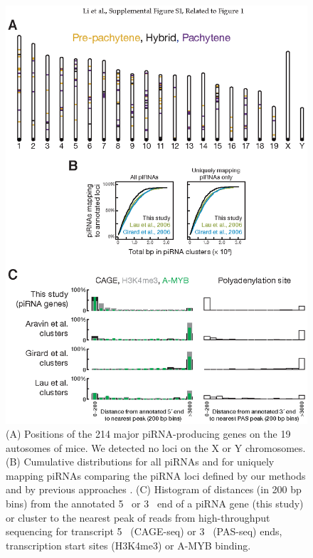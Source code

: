     \begin{figure}[htbp] %
      \centering 
      \includegraphics{Figures/MolCel/MolCel2013_FigS1.eps}
      \caption[The Major piRNA-Producing Genes of the Post-Partum Mouse Testis]
      {
        (A) Positions of the 214 major piRNA-producing genes on the 19 autosomes of mice. We detected no loci on the X or Y chromosomes. (B) Cumulative distributions for all piRNAs and for uniquely mapping piRNAs comparing the piRNA loci defined by our methods and by previous approaches \citep{Girard2006, Lau2006}. (C) Histogram of distances (in 200 bp bins) from the annotated 5\textprime~ or 3\textprime~ end of a piRNA gene (this study) or cluster to the nearest peak of reads from high-throughput sequencing for transcript 5\textprime~ (CAGE-seq) or 3\textprime~ (PAS-seq) ends, transcription start sites (H3K4me3) or A-MYB binding.
        }
      \label{fig:MolCelS1}
        \end{figure}

